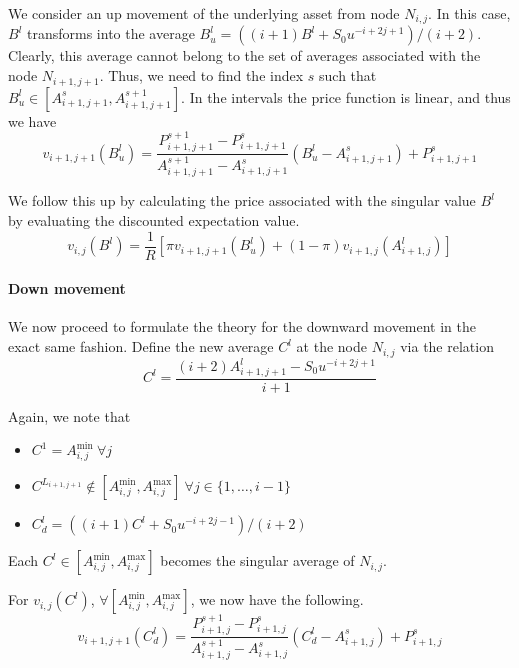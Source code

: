 We consider an up movement of the underlying asset from node $ N_{i,j} $. In this case, $ B^l $ transforms into the average $ B^l_u = \left( (i+1) B^l + S_0 u^{-i+2j+1} \right) / ( i+2 ) $. Clearly, this average cannot belong to the set of averages associated with the node $ N_{i+1,j+1} $. Thus, we need to find the index $s$ such that $ B^l_u \in \left[ A_{i+1,j+1}^{s} , A_{i+1,j+1}^{s+1} \right] $. In the intervals the price function is linear, and thus we have
\begin{equation}
	\label{eq:sp-asian-up-lint}
	v_{i+1,j+1} \left( B^l_u \right) = \frac{ P_{i+1,j+1}^{s+1} - P_{i+1,j+1}^{s} }{ A_{i+1,j+1}^{s+1} - A_{i+1,j+1}^{s} } \left( B^l_u - A_{i+1,j+1}^{s} \right) + P_{i+1,j+1}^{s}
\end{equation}

We follow this up by calculating the price associated with the singular value $ B^l $ by evaluating the discounted expectation value.
\begin{equation}
	\label{eq:sp-asian-up-pr}
	v_{i,j}( B^l ) = \frac{1}{R} \left[ \pi v_{i+1,j+1} \left( B^l_u \right) + (1 - \pi) v_{i+1,j} \left( A_{i+1,j}^l \right) \right]
\end{equation}


\paragraph{Down movement}

We now proceed to formulate the theory for the downward movement in the exact same fashion. Define the new average $ C^l $ at the node $ N_{i,j} $ via the relation
\begin{equation}
	\label{eq:sp-asian-proj-dn}
	C^l = \frac{ ( i+2) A_{i+1,j+1}^l - S_0 u^{-i+2j+1} }{ i+1 }
\end{equation}

Again, we note that
\begin{itemize}
\item $ C^1 = A_{i,j}^{\min} \ \forall j $
\item $ C^{L_{i+1,j+1}} \notin \left[ A_{i,j}^{\min}, A_{i,j}^{\max} \right] \ \forall j \in \{1, \dots, i-1 \} $
\item $ C^l_d = \left( (i+1) C^l + S_0 u^{-i+2j-1} \right) / ( i+2 ) $
\end{itemize}
Each $ C^l \in \left[ A_{i,j}^{\min}, A_{i,j}^{\max} \right] $ becomes the singular average of $ N_{i,j} $.

For $ v_{i,j}( C^l ) $, $ \forall \left[ A_{i,j}^{\min}, A_{i,j}^{\max} \right] $, we now have the following.
\begin{equation}
	\label{eq:sp-asian-dn-lint}
	v_{i+1,j+1} \left( C^l_d \right) = \frac{ P_{i+1,j}^{s+1} - P_{i+1,j}^{s} }{ A_{i+1,j}^{s+1} - A_{i+1,j}^{s} } \left( C^l_d - A_{i+1,j}^{s} \right) + P_{i+1,j}^{s}
\end{equation}


